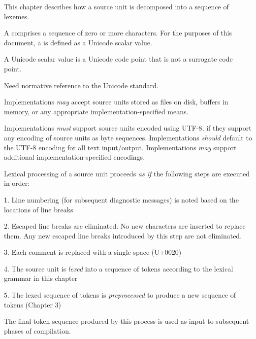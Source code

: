 
This chapter describes how a source unit is decomposed into a sequence of lexemes.


A  comprises a sequence of zero or more characters.
For the purposes of this document, a  is defined as a Unicode scalar value.

\begin{Note}
A Unicode scalar value is a Unicode code point that is not a surrogate code point.
\end{Note}

\begin{TODO}
Need normative reference to the Unicode standard.    
\end{TODO} 

Implementations \emph{may} accept source units stored as files on disk, buffers in memory, or any appropriate implementation-specified means.


Implementations \emph{must} support source units encoded using UTF-8, if they support any encoding of source units as byte sequences.
Implementations \emph{should} default to the UTF-8 encoding for all text input/output.
Implementations \emph{may} support additional implementation-specified encodings.


Lexical processing of a source unit proceeds \emph{as if} the following steps are executed in order:

1. Line numbering (for subsequent diagnostic messages) is noted based on the locations of line breaks

2. Escaped line breaks are eliminated. No new characters are inserted to replace them. Any new escaped line breaks introduced by this step are not eliminated.

3. Each comment is replaced with a single space (U+0020)

4. The source unit is \emph{lexed} into a sequence of tokens according to the lexical grammar in this chapter

5. The lexed sequence of tokens is \emph{preprocessed} to produce a new sequence of tokens (Chapter 3)

The final token sequence produced by this process is used as input to subsequent phases of compilation.

